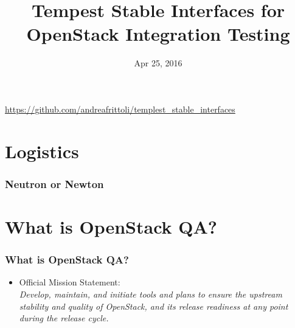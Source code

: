\documentclass[aspectratio=169,11pt,hyperref={colorlinks=true}]{beamer}
\author[Andrea Frittoli]{%
    \texorpdfstring{
        \begin{columns}
            \column{.45\linewidth}
            \centering
            Andrea Frittoli\\
            \href{mailto:andrea.frittoli@hpe.com}{andrea.frittoli@hpe.com}\\
            \texttt{andreaf on Freenode}
        \end{columns}
   }
   {Andrea Frittoli}
}
\date{Apr 25, 2016}
\title[Tempest Stable Interfaces for OpenStack Integration Testing
\hspace{2em}\insertframenumber/\inserttotalframenumber]{Tempest Stable Interfaces for OpenStack Integration Testing}
\begin{document}
{
\begin{frame}[noframenumbering]
    \hypersetup{colorlinks,urlcolor=white}
    \titlepage{}
    \centering
    \href{https://github.com/andreafrittoli/templest\_stable\_interfaces}{https://github.com/andreafrittoli/templest\_stable\_interfaces}
\end{frame}
}

\section{Logistics}
\begin{frame}[c]
    \frametitle{Neutron or Newton}
    \begin{center}
        \Huge {}
    \end{center}
\end{frame}

\section{What is OpenStack QA?}
\begin{frame}
    \frametitle{What is OpenStack QA?}
    \begin{itemize}
     \item Official Mission Statement:\\
         \textit{Develop, maintain, and initiate tools and plans to ensure
the upstream stability and quality of OpenStack, and its release readiness at
any point during the release cycle.}
    \end{itemize}
\end{frame}
\end{document}
